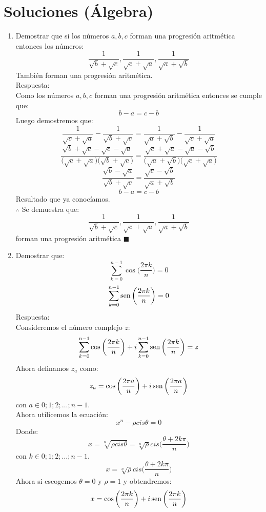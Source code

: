 \documentclass{book}
\newcommand{\sen}{\mathop{\rm sen}\nolimits} %
\begin{document}
    \newpage


    \section{Soluciones (Álgebra)}
    \begin{enumerate}
        \item Demostrar que si los números $a,b,c$ forman una progresión aritmética entonces los números:
        $$\frac{1}{\sqrt{b}+\sqrt{c}},\frac{1}{\sqrt{c}+\sqrt{a}},\frac{1}{\sqrt{a}+\sqrt{b}}$$
        También forman una progresión aritmética.\\
        Respuesta:\\
        Como los números $a,b,c$ forman una progresión aritmética entonces se cumple que:
        $$b-a=c-b$$
        Luego demostremos que:
        $$\frac{1}{\sqrt{c}+\sqrt{a}}-\frac{1}{\sqrt{b}+\sqrt{c}}=\frac{1}{\sqrt{a}+\sqrt{b}}-\frac{1}{\sqrt{c}+\sqrt{a}}$$
        $$\frac{\sqrt{b}+\sqrt{c}-\sqrt{c}-\sqrt{a}}{\big(\sqrt{c}+\sqrt{a}\big)\big(\sqrt{b}+\sqrt{c}\big)} =\frac{\sqrt{c}+\sqrt{a}-\sqrt{a}-\sqrt{b}}{\big(\sqrt{a}+\sqrt{b}\big)\big(\sqrt{c}+\sqrt{a}\big)} $$
        $$\frac{\sqrt{b}-\sqrt{a}}{\sqrt{b}+\sqrt{c}}=\frac{\sqrt{c}-\sqrt{b}}{\sqrt{a}+\sqrt{b}}$$
        $$b-a=c-b$$
        Resultado que ya conocíamos.\\
        $\therefore$ Se demuestra que:
        $$\frac{1}{\sqrt{b}+\sqrt{c}},\frac{1}{\sqrt{c}+\sqrt{a}},\frac{1}{\sqrt{a}+\sqrt{b}}$$
        forman una progresión aritmética $\blacksquare$\\
        \item Demostrar que:
        $$ \sum_{k=0}^{n-1}\cos{\bigg(\frac{2\pi k}{n}\bigg)}=0$$
        $$ \sum_{k=0}^{n-1}\sen{\bigg(\frac{2\pi k}{n}\bigg)}=0$$
        Respuesta:\\
        Consideremos el número complejo $z$:
        $$\sum_{k=0}^{n-1}\cos{\bigg(\frac{2\pi k}{n}\bigg)} +i\sum_{k=0}^{n-1}\sen{\bigg(\frac{2\pi k}{n}\bigg)} =z$$
        Ahora definamos $z_a$ como:
        $$z_a=\cos{\bigg(\frac{2\pi a}{n}\bigg)} +i\sen{\bigg(\frac{2\pi a}{n}\bigg)}$$
        con $a \in {0;1;2;…;n-1}$.\\
        Ahora utilicemos la ecuación:
        $$x^n-\rho cis\theta=0$$
        Donde:
        $$x=\sqrt[n]{\rho cis\theta}=\sqrt[n]{\rho}cis\bigg(\frac{\theta+2k\pi}{n}\bigg)$$
        con $k \in {0;1;2;…;n-1}$.
        $$x=\sqrt[n]{\rho}cis\bigg(\frac{\theta+2k\pi}{n}\bigg)$$
        Ahora si escogemos $\theta=0$ y $\rho=1$ y obtendremos:
        $$x=\cos{\bigg(\frac{2\pi k}{n}\bigg)} +i\sen{\bigg(\frac{2\pi k}{n}\bigg)}$$

\end{enumerate}
\end{document}
